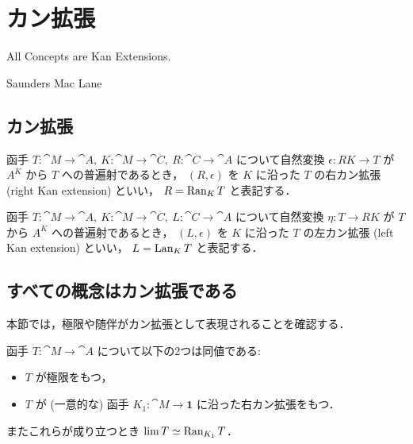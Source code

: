\documentclass[titlepage]{ltjsreport}
\newtheorem[S]{theorem}{定理}[chapter]
\newtheorem[S]{definition}[theorem]{定義}
\newtheorem[S]{example}[theorem]{例}
\begin{document}
\chapter{カン拡張}

\epigraph{All Concepts are Kan Extensions.}{Saunders Mac Lane}

\section{カン拡張}

\begin{definition}[右カン拡張]
  函手
  $T:\cat{M}\to\cat{A},\ K:\cat{M}\to\cat{C},\ R:\cat{C}\to\cat{A}$
  について自然変換
  $\epsilon:RK\to T$
  が
  $A^K$
  から
  $T$
  への普遍射であるとき，
  $(R,\epsilon)$
  を
  $K$
  に沿った
  $T$
  の右カン拡張
  (right Kan extension)
  といい，
  $R=\operatorname{Ran}_{K}T$
  と表記する．
\end{definition}

\begin{center}
  
\end{center}

\begin{definition}[左カン拡張]
  函手
  $T:\cat{M}\to\cat{A},\ K:\cat{M}\to\cat{C},\ L:\cat{C}\to\cat{A}$
  について自然変換
  $\eta:T\to RK$
  が
  $T$
  から
  $A^K$
  への普遍射であるとき，
  $(L,\epsilon)$
  を
  $K$
  に沿った
  $T$
  の左カン拡張
  (left Kan extension)
  といい，
  $L=\operatorname{Lan}_{K}T$
  と表記する．
\end{definition}

\begin{center}
  
\end{center}

\section{すべての概念はカン拡張である}

本節では，極限や随伴がカン拡張として表現されることを確認する．

\begin{theorem}[極限は右カン拡張である]\label{thm:limit-is-right-kan-extension}
  函手 $T:\cat{M}\to\cat{A}$ について以下の2つは同値である:
  \begin{itemize}
    \item $T$ が極限をもつ，
    \item $T$ が (一意的な) 函手 $K_1:\cat{M}\to\mathbf{1}$
          に沿った右カン拡張をもつ．
  \end{itemize}
  またこれらが成り立つとき $\lim T\simeq\operatorname{Ran}_{K_1}T$．
\end{theorem}
\end{document}
